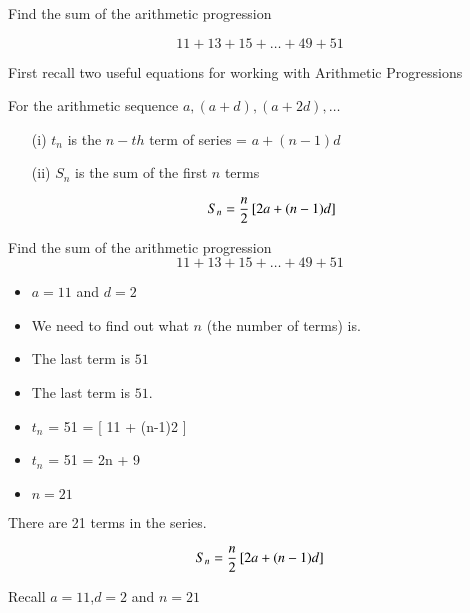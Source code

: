 \documentclass[12pt]{article}
\begin{document}


Find the sum of the arithmetic progression
{

\[ 11 + 13 + 15 + \dots + 49 + 51 \]
}



First recall two useful equations for working with Arithmetic Progressions


For the arithmetic sequence $a,(a+d) ,(a+2d), \ldots$

\begin{itemize}
\item[(i)] $t_n$ is the $n-th$ term of series = $a+(n-1)d$

\item[(ii)] $S_n$ is the sum of the first $n$ terms

\[ S_n  = {n \over 2} \left[ 2a+(n-1)d \right] \]
\end{itemize}



Find the sum of the arithmetic progression
{
\[ 11 + 13 + 15 + \dots + 49 + 51 \]
}

\begin{itemize}
\item $a=11$ and $d=2$
\item We need to find out what $n$ (the number of terms) is.
\item The last term is $51$
\end{itemize}




\begin{itemize}
\item The last term is $51$.
\item $t_n$ = 51 = [ 11 + (n-1)2 ] 
\item $t_n$ = 51 = 2n + 9
\item $n=21$
\end{itemize}
There are 21 terms in the series.




\[ S_n  = {n \over 2} \left[ 2a+(n-1)d \right] \]

Recall $a=11$,$d=2$ and $n=21$
\end{document}
